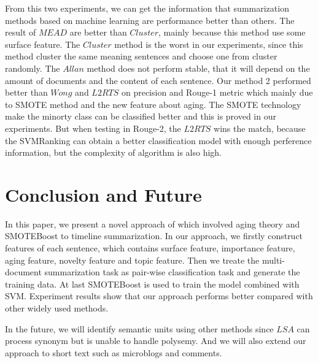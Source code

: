 \documentclass{acm_proc_article-sp}
\begin{document}
From this two experiments, we can get the information that summarization methods based on machine learning are performance better than others. 
The result of $MEAD$ are better than $Cluster$, mainly because this method use some surface feature.
The $Cluster$ method is the worst in our experiments, since this method cluster the same meaning sentences and choose one from cluster randomly. 
The $Allan$ method does not perform stable, that it will depend on the amount of documents and the content of each sentence. 
Our method 2 performed better than $Wong$ and $L2RTS$ on precision and Rouge-1 metric which mainly due to  SMOTE method and the new feature about aging. 
The SMOTE technology make the minorty class can be classified better and this is proved in our experiments.
But when testing in Rouge-2, the $L2RTS$ wins the match, because the SVMRanking can obtain a better classification model with enough perference information, but the complexity of algorithm is also high.

%
\section{Conclusion and Future}
%

In this paper, we present a novel approach of which involved aging theory and SMOTEBoost to timeline summarization. In our approach, we firstly construct features of each sentence, which contains surface feature, importance feature, aging feature, novelty feature and topic feature. Then we treate the multi-document summarization task as pair-wise classification task and generate the training data. At last SMOTEBoost is used to train the model combined with SVM. Experiment results show that our approach performs better compared with other widely used methods.

In the future, we will identify semantic units using other methods since $LSA$ can process synonym but is unable to handle polysemy. And we will also extend our approach to short text such as microblogs and comments.




%


\end{document}
